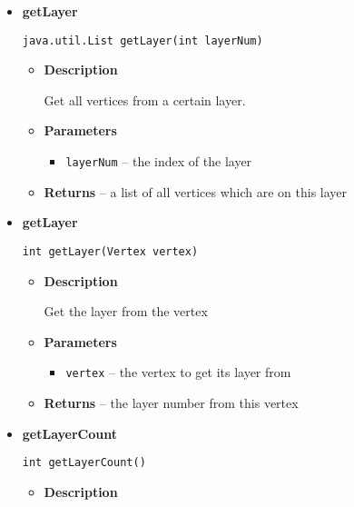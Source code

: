 {{{{{{{{{{{{\begin{itemize}
{\begin{itemize}
{Returns the height, i.e. the number of layers.
}
\item{{\bf  Returns} -- 
the height 
}%
\end{itemize}
}%
\item{ 
{\bf  getLayer}\\
\begin{lstlisting}[frame=none]
java.util.List getLayer(int layerNum)\end{lstlisting} %
\begin{itemize}
\item{
{\bf  Description}

Get all vertices from a certain layer.
}
\item{
{\bf  Parameters}
  \begin{itemize}
   \item{
\texttt{layerNum} -- the index of the layer}
  \end{itemize}
}%
\item{{\bf  Returns} -- 
a list of all vertices which are on this layer 
}%
\end{itemize}
}%
\item{ 
{\bf  getLayer}\\
\begin{lstlisting}[frame=none]
int getLayer(Vertex vertex)\end{lstlisting} %
\begin{itemize}
\item{
{\bf  Description}

Get the layer from the vertex
}
\item{
{\bf  Parameters}
  \begin{itemize}
   \item{
\texttt{vertex} -- the vertex to get its layer from}
  \end{itemize}
}%
\item{{\bf  Returns} -- 
the layer number from this vertex 
}%
\end{itemize}
}%
\item{ 
{\bf  getLayerCount}\\
\begin{lstlisting}[frame=none]
int getLayerCount()\end{lstlisting} %
\begin{itemize}
\item{
{\bf  Description}

}
\end{itemize}}
\end{itemize}}}}}}}}}}}}}
